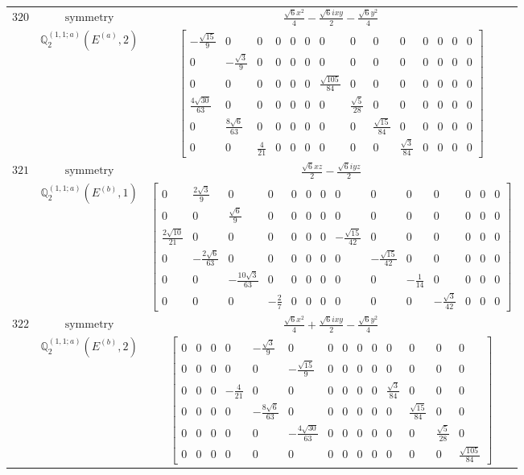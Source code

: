 \documentclass[fleqn,8pt,landscape]{jsarticle}
\begin{document}
\begin{longtable}{ccc}
$ 320 $ & $ \text{symmetry} $ & $ \frac{\sqrt{6} x^{2}}{4} - \frac{\sqrt{6} i x y}{2} - \frac{\sqrt{6} y^{2}}{4} $ \\
$  $ & $ \mathbb{Q}_{2}^{(1,1;a)}(E^{(a)},2) $ & $ \begin{bmatrix} - \frac{\sqrt{15}}{9} & 0 & 0 & 0 & 0 & 0 & 0 & 0 & 0 & 0 & 0 & 0 & 0 & 0 \\ 0 & - \frac{\sqrt{3}}{9} & 0 & 0 & 0 & 0 & 0 & 0 & 0 & 0 & 0 & 0 & 0 & 0 \\ 0 & 0 & 0 & 0 & 0 & 0 & \frac{\sqrt{105}}{84} & 0 & 0 & 0 & 0 & 0 & 0 & 0 \\ \frac{4 \sqrt{30}}{63} & 0 & 0 & 0 & 0 & 0 & 0 & \frac{\sqrt{5}}{28} & 0 & 0 & 0 & 0 & 0 & 0 \\ 0 & \frac{8 \sqrt{6}}{63} & 0 & 0 & 0 & 0 & 0 & 0 & \frac{\sqrt{15}}{84} & 0 & 0 & 0 & 0 & 0 \\ 0 & 0 & \frac{4}{21} & 0 & 0 & 0 & 0 & 0 & 0 & \frac{\sqrt{3}}{84} & 0 & 0 & 0 & 0 \end{bmatrix} $ \\ \hline
$ 321 $ & $ \text{symmetry} $ & $ \frac{\sqrt{6} x z}{2} - \frac{\sqrt{6} i y z}{2} $ \\
$  $ & $ \mathbb{Q}_{2}^{(1,1;a)}(E^{(b)},1) $ & $ \begin{bmatrix} 0 & \frac{2 \sqrt{3}}{9} & 0 & 0 & 0 & 0 & 0 & 0 & 0 & 0 & 0 & 0 & 0 & 0 \\ 0 & 0 & \frac{\sqrt{6}}{9} & 0 & 0 & 0 & 0 & 0 & 0 & 0 & 0 & 0 & 0 & 0 \\ \frac{2 \sqrt{10}}{21} & 0 & 0 & 0 & 0 & 0 & 0 & - \frac{\sqrt{15}}{42} & 0 & 0 & 0 & 0 & 0 & 0 \\ 0 & - \frac{2 \sqrt{6}}{63} & 0 & 0 & 0 & 0 & 0 & 0 & - \frac{\sqrt{15}}{42} & 0 & 0 & 0 & 0 & 0 \\ 0 & 0 & - \frac{10 \sqrt{3}}{63} & 0 & 0 & 0 & 0 & 0 & 0 & - \frac{1}{14} & 0 & 0 & 0 & 0 \\ 0 & 0 & 0 & - \frac{2}{7} & 0 & 0 & 0 & 0 & 0 & 0 & - \frac{\sqrt{3}}{42} & 0 & 0 & 0 \end{bmatrix} $ \\ \hline
$ 322 $ & $ \text{symmetry} $ & $ \frac{\sqrt{6} x^{2}}{4} + \frac{\sqrt{6} i x y}{2} - \frac{\sqrt{6} y^{2}}{4} $ \\
$  $ & $ \mathbb{Q}_{2}^{(1,1;a)}(E^{(b)},2) $ & $ \begin{bmatrix} 0 & 0 & 0 & 0 & - \frac{\sqrt{3}}{9} & 0 & 0 & 0 & 0 & 0 & 0 & 0 & 0 & 0 \\ 0 & 0 & 0 & 0 & 0 & - \frac{\sqrt{15}}{9} & 0 & 0 & 0 & 0 & 0 & 0 & 0 & 0 \\ 0 & 0 & 0 & - \frac{4}{21} & 0 & 0 & 0 & 0 & 0 & 0 & \frac{\sqrt{3}}{84} & 0 & 0 & 0 \\ 0 & 0 & 0 & 0 & - \frac{8 \sqrt{6}}{63} & 0 & 0 & 0 & 0 & 0 & 0 & \frac{\sqrt{15}}{84} & 0 & 0 \\ 0 & 0 & 0 & 0 & 0 & - \frac{4 \sqrt{30}}{63} & 0 & 0 & 0 & 0 & 0 & 0 & \frac{\sqrt{5}}{28} & 0 \\ 0 & 0 & 0 & 0 & 0 & 0 & 0 & 0 & 0 & 0 & 0 & 0 & 0 & \frac{\sqrt{105}}{84} \end{bmatrix} $ \\ \hline

\end{longtable}
\end{document}
